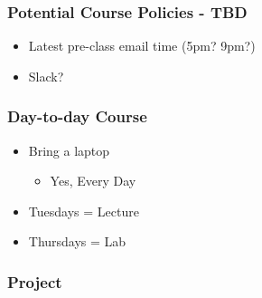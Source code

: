 \documentclass{beamer}
\begin{document}
\begin{frame}
\frametitle{Potential Course Policies - TBD}
\begin{itemize}
\item<1-> Latest pre-class email time (5pm? 9pm?)
\item<2-> Slack?
\end{itemize}
%
\end{frame}

\begin{frame}
\frametitle{Day-to-day Course}
\begin{itemize}
\item<1-> Bring a laptop
\begin{itemize}
	\item<2-> Yes, Every Day
\end{itemize}
\item<3-> Tuesdays = Lecture
\item<4-> Thursdays = Lab
\end{itemize}
\end{frame}
\begin{frame}
\frametitle{Project}
\end{frame}
\end{document}
